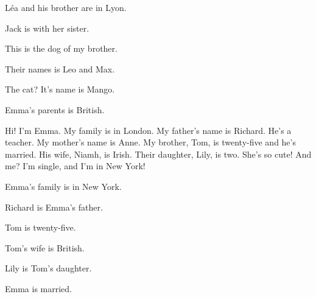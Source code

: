 \begin{questions}
\item Léa and his brother are in Lyon. \hfill {}
\item Jack is with her sister. \hfill {}
\item This is the dog of my brother. \hfill {}
\item Their names is Leo and Max. \hfill {}
\item The cat? It's name is Mango. \hfill {}
\item Emma's parents is British. \hfill {}
\end{questions}

\begin{anglais}
\begin{tcolorbox}[otBase,colback=white,colframe=otRule,boxrule=0.5pt,fontupper=\fontsize{10.8}{14.4}\selectfont]
Hi! I'm Emma. My family is in London. My father's name is Richard. He's a teacher. My mother's
name is Anne. My brother, Tom, is twenty-five and he's married. His wife, Niamh, is Irish.
Their daughter, Lily, is two. She's so cute! And me? I'm single, and I'm in New York!
\par{}
\end{tcolorbox}
\begin{questions}[2]
\item Emma's family is in New York. \hfill{}
\item Richard is Emma's father. \hfill{}
\item Tom is twenty-five. \hfill{}
\item Tom's wife is British. \hfill{}
\item Lily is Tom's daughter. \hfill{}
\item Emma is married. \hfill{}
\end{questions}
\end{anglais}

